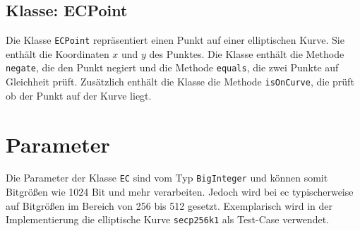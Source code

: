 \subsection{Klasse: ECPoint}
Die Klasse \texttt{ECPoint} repräsentiert einen Punkt auf einer elliptischen Kurve. Sie enthält die Koordinaten $x$ und $y$ des Punktes. Die Klasse enthält die Methode \texttt{negate}, die den Punkt negiert und die Methode \texttt{equals}, die zwei Punkte auf Gleichheit prüft. Zusätzlich enthält die Klasse die Methode \texttt{isOnCurve}, die prüft ob der Punkt auf der Kurve liegt.

\section{Parameter}
Die Parameter der Klasse \texttt{EC} sind vom Typ \texttt{BigInteger} und können somit Bitgrößen wie 1024 Bit und mehr verarbeiten. Jedoch wird bei \gls{ec} typischerweise auf Bitgrößen im Bereich von 256 bis 512 gesetzt. Exemplarisch wird in der Implementierung die elliptische Kurve \texttt{secp256k1} als Test-Case verwendet.

